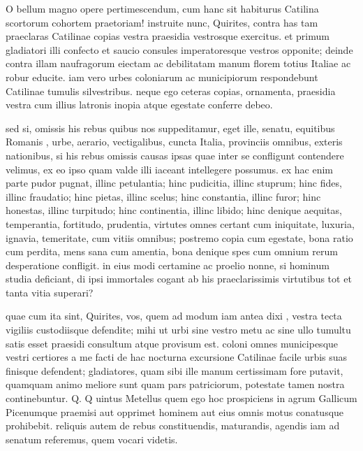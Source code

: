  O bellum magno opere pertimescendum, cum hanc sit habiturus Catilina scortorum cohortem praetoriam! instruite nunc, Quirites, contra has tam praeclaras Catilinae copias vestra praesidia vestrosque exercitus. et primum gladiatori illi confecto et saucio consules imperatoresque vestros opponite; deinde contra illam naufragorum eiectam ac debilitatam manum florem totius Italiae ac robur educite. iam vero urbes coloniarum ac municipiorum respondebunt Catilinae tumulis silvestribus. neque ego ceteras copias, ornamenta, praesidia vestra cum illius latronis inopia atque egestate conferre debeo.

 sed si, omissis his rebus quibus nos suppeditamur, eget ille, senatu, equitibus Romanis , urbe, aerario, vectigalibus, cuncta Italia, provinciis omnibus, exteris nationibus, si his rebus omissis causas ipsas quae inter se confligunt contendere velimus, ex eo ipso quam valde illi iaceant intellegere possumus. ex hac enim parte pudor pugnat, illinc petulantia; hinc pudicitia, illinc stuprum; hinc fides, illinc fraudatio; hinc pietas, illinc scelus; hinc constantia, illinc furor; hinc honestas, illinc turpitudo; hinc continentia, illinc libido; hinc denique aequitas, temperantia, fortitudo, prudentia, virtutes omnes certant cum iniquitate, luxuria, ignavia, temeritate, cum vitiis omnibus; postremo copia cum egestate, bona ratio cum perdita, mens sana cum amentia, bona denique spes cum omnium rerum desperatione confligit. in eius modi certamine ac proelio nonne, si hominum studia deficiant, di ipsi immortales cogant ab his praeclarissimis virtutibus tot et tanta vitia superari?

 quae cum ita sint, Quirites, vos, quem ad modum iam antea dixi , vestra tecta vigiliis custodiisque defendite; mihi ut urbi sine vestro metu ac sine ullo tumultu satis esset praesidi consultum atque provisum est. coloni omnes municipesque vestri certiores a me facti de hac nocturna excursione Catilinae facile urbis suas finisque defendent; gladiatores, quam sibi ille manum certissimam fore putavit, quamquam animo meliore sunt quam pars patriciorum, potestate tamen nostra continebuntur. Q. Q uintus Metellus quem ego hoc prospiciens in agrum Gallicum Picenumque praemisi aut opprimet hominem aut eius omnis motus conatusque prohibebit. reliquis autem de rebus constituendis, maturandis, agendis iam ad senatum referemus, quem vocari videtis.

